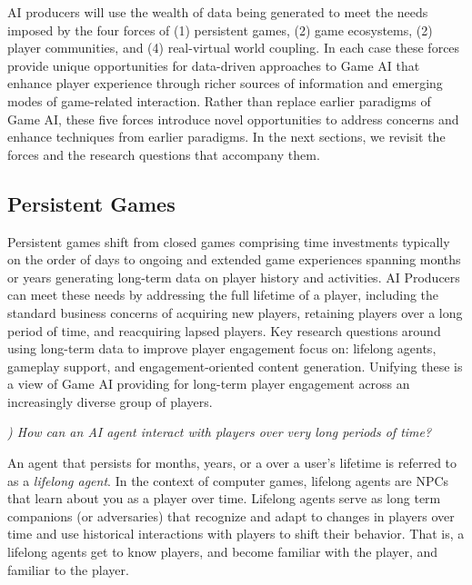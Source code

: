 \documentclass[conference]{IEEEtran}
\newcounter{questionno}
\newcommand{\subsubsectionx}[1]{{\em {\arabic{questionno}) #1}}
	\addtocounter{questionno}{1}
	}
\begin{document}
AI producers will use the wealth of data being generated to meet the needs imposed by the four forces of (1) persistent games, (2) game ecosystems, (2) player communities, and (4) real-virtual world coupling. 
In each case these forces provide unique opportunities for data-driven approaches to Game AI that enhance player experience through richer sources of information and emerging modes of game-related interaction. 
Rather than replace earlier paradigms of Game AI, these five forces introduce novel opportunities to address concerns and enhance techniques from earlier paradigms.
%
In the next sections, we revisit the forces and the research questions that accompany them.

\subsection{Persistent Games}

Persistent games shift from closed games comprising time investments typically on the order of days to ongoing and extended game experiences spanning months or years generating long-term data on player history and activities. AI Producers can meet these needs by addressing the full lifetime of a player, including the standard business concerns of acquiring new players, retaining players over a long period of time, and reacquiring lapsed players. 
Key research questions around using long-term data to improve player engagement focus on: lifelong agents, gameplay support, and engagement-oriented content generation. 
Unifying these is a view of Game AI providing for long-term player engagement across an increasingly diverse group of players.

\subsubsectionx{How can an AI agent interact with players over very long periods of time?}
%
An agent that persists for months, years, or a over a user's lifetime is referred to as a {\em lifelong agent}. 
In the context of computer games, lifelong agents are NPCs that learn about you as a player over time. 
Lifelong agents serve as long term companions (or adversaries) that 
recognize and adapt to  
changes in players over time and use historical interactions with players to shift their behavior.
That is, a lifelong agents get to know players, and become familiar with the player, and familiar to the player.
%
\end{document}
